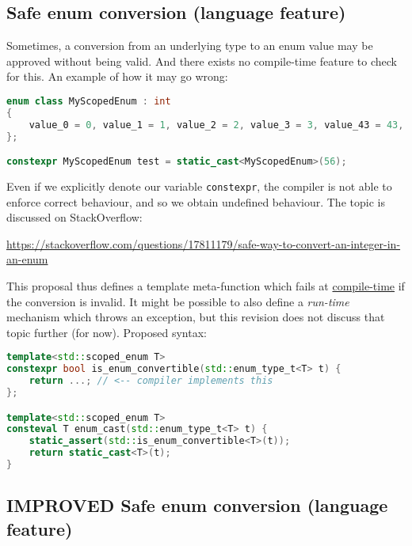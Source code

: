 \documentclass[
  format=manuscript,
  screen=true,
  review=false,
  nonacm=true,
  timestamp=true,
  balance=false]{acmart}
\begin{document}
\subsection{Safe enum conversion (language feature)}

Sometimes, a conversion from an underlying type to an enum value may be approved
without being valid. And there exists no compile-time feature to check for this.
An example of how it may go wrong:\vspace{2mm}

\begin{lstlisting}[language=Cpp]
enum class MyScopedEnum : int
{
    value_0 = 0, value_1 = 1, value_2 = 2, value_3 = 3, value_43 = 43, value_57 = 57
};

constexpr MyScopedEnum test = static_cast<MyScopedEnum>(56);
\end{lstlisting}

\noindent
Even if we explicitly denote our variable \texttt{constexpr}, the compiler is not
able to enforce correct behaviour, and so we obtain undefined behaviour. The topic
is discussed on StackOverflow:

\noindent
\url{https://stackoverflow.com/questions/17811179/safe-way-to-convert-an-integer-in-an-enum}

\vspace{3mm}\noindent
This proposal thus defines a template meta-function which fails at
\underline{compile-time} if the conversion is invalid. It might be possible to also
define a \textit{run-time} mechanism which throws an exception, but this revision
does not discuss that topic further (for now). Proposed syntax:\vspace{2mm}

\begin{lstlisting}[language=Cpp]
template<std::scoped_enum T>
constexpr bool is_enum_convertible(std::enum_type_t<T> t) {
    return ...; // <-- compiler implements this
};

template<std::scoped_enum T>
consteval T enum_cast(std::enum_type_t<T> t) {
    static_assert(std::is_enum_convertible<T>(t));
    return static_cast<T>(t);
}
\end{lstlisting}


\subsection{IMPROVED Safe enum conversion (language feature)}
\end{document}
